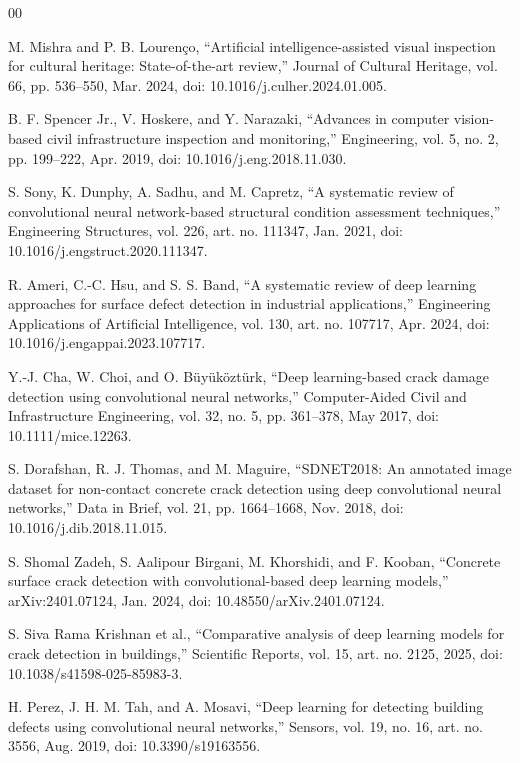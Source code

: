 \documentclass[conference]{IEEEtran}
\begin{document}
\begin{thebibliography}{00}

 M. Mishra and P. B. Lourenço, ``Artificial intelligence-assisted visual inspection for cultural heritage: State-of-the-art review,'' Journal of Cultural Heritage, vol. 66, pp. 536--550, Mar. 2024, doi: 10.1016/j.culher.2024.01.005.

 B. F. Spencer Jr., V. Hoskere, and Y. Narazaki, ``Advances in computer vision-based civil infrastructure inspection and monitoring,'' Engineering, vol. 5, no. 2, pp. 199--222, Apr. 2019, doi: 10.1016/j.eng.2018.11.030.

 S. Sony, K. Dunphy, A. Sadhu, and M. Capretz, ``A systematic review of convolutional neural network-based structural condition assessment techniques,'' Engineering Structures, vol. 226, art. no. 111347, Jan. 2021, doi: 10.1016/j.engstruct.2020.111347.

 R. Ameri, C.-C. Hsu, and S. S. Band, ``A systematic review of deep learning approaches for surface defect detection in industrial applications,'' Engineering Applications of Artificial Intelligence, vol. 130, art. no. 107717, Apr. 2024, doi: 10.1016/j.engappai.2023.107717.

 Y.-J. Cha, W. Choi, and O. Büyüköztürk, ``Deep learning-based crack damage detection using convolutional neural networks,'' Computer-Aided Civil and Infrastructure Engineering, vol. 32, no. 5, pp. 361--378, May 2017, doi: 10.1111/mice.12263.

 S. Dorafshan, R. J. Thomas, and M. Maguire, ``SDNET2018: An annotated image dataset for non-contact concrete crack detection using deep convolutional neural networks,'' Data in Brief, vol. 21, pp. 1664--1668, Nov. 2018, doi: 10.1016/j.dib.2018.11.015.

 S. Shomal Zadeh, S. Aalipour Birgani, M. Khorshidi, and F. Kooban, ``Concrete surface crack detection with convolutional-based deep learning models,'' arXiv:2401.07124, Jan. 2024, doi: 10.48550/arXiv.2401.07124.

 S. Siva Rama Krishnan et al., ``Comparative analysis of deep learning models for crack detection in buildings,'' Scientific Reports, vol. 15, art. no. 2125, 2025, doi: 10.1038/s41598-025-85983-3.

 H. Perez, J. H. M. Tah, and A. Mosavi, ``Deep learning for detecting building defects using convolutional neural networks,'' Sensors, vol. 19, no. 16, art. no. 3556, Aug. 2019, doi: 10.3390/s19163556.


\end{thebibliography}
\end{document}
